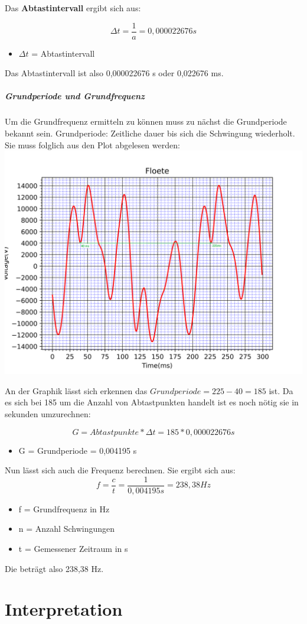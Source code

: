 Das \textbf{Abtastintervall} ergibt sich aus:

\begin{equation}
	\Delta t = \frac{1}{a} = 0,000022676 s
\end{equation}
\begin{itemize}
	\item $\Delta t$ = Abtastintervall
\end{itemize}

Das Abtastintervall ist also 0,000022676 s oder 0,022676 ms.

\subparagraph*{Grundperiode und Grundfrequenz}

Um die Grundfrequenz ermitteln zu können muss zu nächst die Grundperiode bekannt sein.
Grundperiode: Zeitliche dauer bis sich die Schwingung wiederholt. Sie muss folglich aus den Plot abgelesen werden:
\includegraphics[scale=0.05]{media/Signal_Raster_Periode.png}

An der Graphik lässt sich erkennen das $ Grundperiode = 225 - 40 = 185 $ ist.
Da es sich bei 185 um die Anzahl von Abtastpunkten handelt ist es noch nötig sie in sekunden umzurechnen:

\begin{equation}
	G = Abtastpunkte \ast \Delta t = 185 \ast 0,000022676 s
\end{equation}
\begin{itemize}
	\item G = Grundperiode = 0,004195 s 
\end{itemize}

Nun lässt sich auch die Frequenz berechnen. 
Sie ergibt sich aus:
\begin{equation}
	f =  \frac{c}{t} = \frac{1}{0,004195 s} = 238,38 Hz
\end{equation}
\begin{itemize}
	\item f = Grundfrequenz in Hz 
	\item n = Anzahl Schwingungen
	\item t = Gemessener Zeitraum in s
\end{itemize}

Die  beträgt also 238,38 Hz.

\section{Interpretation}
\label{chap:VERSUCH_1_INTERPRETATION}